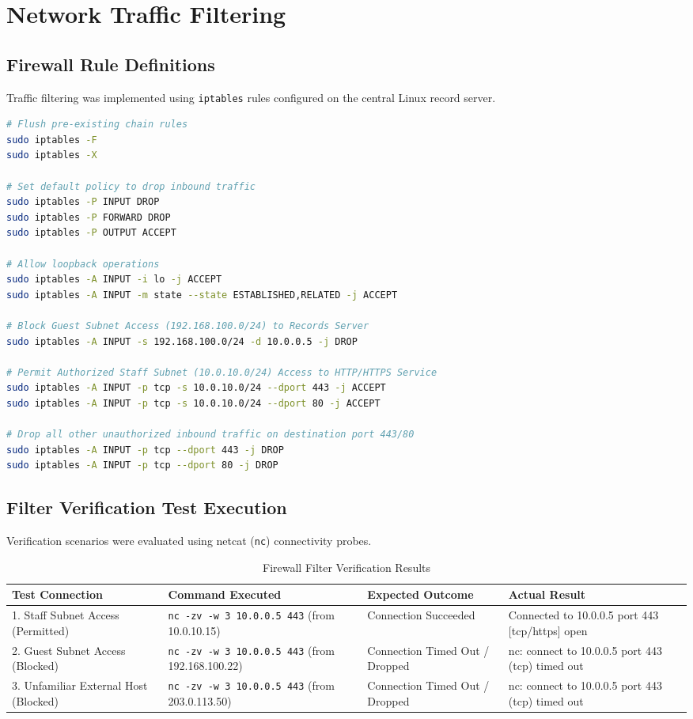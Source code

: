 \documentclass[12pt,a4paper]{article}
\begin{document}
\section{Network Traffic Filtering}

\subsection{Firewall Rule Definitions}
Traffic filtering was implemented using \texttt{iptables} rules configured on the central Linux record server.

\begin{lstlisting}[language=bash, caption=iptables Network Rule Configuration]
# Flush pre-existing chain rules
sudo iptables -F
sudo iptables -X

# Set default policy to drop inbound traffic
sudo iptables -P INPUT DROP
sudo iptables -P FORWARD DROP
sudo iptables -P OUTPUT ACCEPT

# Allow loopback operations
sudo iptables -A INPUT -i lo -j ACCEPT
sudo iptables -A INPUT -m state --state ESTABLISHED,RELATED -j ACCEPT

# Block Guest Subnet Access (192.168.100.0/24) to Records Server
sudo iptables -A INPUT -s 192.168.100.0/24 -d 10.0.0.5 -j DROP

# Permit Authorized Staff Subnet (10.0.10.0/24) Access to HTTP/HTTPS Service
sudo iptables -A INPUT -p tcp -s 10.0.10.0/24 --dport 443 -j ACCEPT
sudo iptables -A INPUT -p tcp -s 10.0.10.0/24 --dport 80 -j ACCEPT

# Drop all other unauthorized inbound traffic on destination port 443/80
sudo iptables -A INPUT -p tcp --dport 443 -j DROP
sudo iptables -A INPUT -p tcp --dport 80 -j DROP
\end{lstlisting}

\subsection{Filter Verification Test Execution}
Verification scenarios were evaluated using netcat (\texttt{nc}) connectivity probes.

\begin{table}[h!]
\centering
\begin{tabular}{p{3.5cm} p{4.5cm} p{3.5cm} p{3.5cm}}
\toprule
\textbf{Test Connection} & \textbf{Command Executed} & \textbf{Expected Outcome} & \textbf{Actual Result} \\
\midrule
1. Staff Subnet Access (Permitted) & \texttt{nc -zv -w 3 10.0.0.5 443} (from 10.0.10.15) & Connection Succeeded & Connected to 10.0.0.5 port 443 [tcp/https] open \\
2. Guest Subnet Access (Blocked) & \texttt{nc -zv -w 3 10.0.0.5 443} (from 192.168.100.22) & Connection Timed Out / Dropped & nc: connect to 10.0.0.5 port 443 (tcp) timed out \\
3. Unfamiliar External Host (Blocked) & \texttt{nc -zv -w 3 10.0.0.5 443} (from 203.0.113.50) & Connection Timed Out / Dropped & nc: connect to 10.0.0.5 port 443 (tcp) timed out \\
\bottomrule
\end{tabular}
\caption{Firewall Filter Verification Results}
\end{table}
\end{document}
